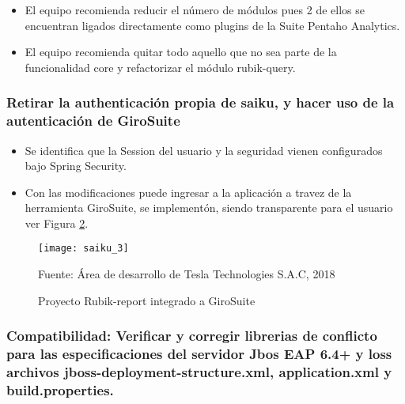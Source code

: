 \begin{spacing}{1.5}
\begin{itemize}
			\begin{figure}[H]
				\centering
				\texttt{[image: saiku\_2]}
				\caption {\centering \small{Proyecto Rubik-report, c\'{o}digo fuente}} \label{figure:chaperIII_5}
				\small {Fuente: \'{A}rea de desarrollo de Tesla Technologies S.A.C, 2018}
			\end{figure}
			
			\item El equipo recomienda reducir el n\'{u}mero de m\'{o}dulos pues 2 de ellos se encuentran ligados directamente como plugins de la Suite Pentaho Analytics.
			\item El equipo recomienda quitar todo aquello que no sea parte de la funcionalidad core y refactorizar el m\'{o}dulo rubik-query.
		\end{itemize}	
		\clearpage	
		\subsubsection{Retirar la authenticación propia de saiku, y hacer uso de la autenticación de GiroSuite}
		
		\begin{itemize}
			\item Se identifica que la Session  del usuario y la seguridad vienen configurados bajo Spring Security.
			\item Con las modificaciones puede ingresar a la aplicaci\'{o}n a travez de la herramienta GiroSuite, se implement\'{o}n, siendo transparente para el usuario ver Figura \ref{figure:chaperIII_6}.
		\end{itemize}
		
		\begin{figure}[H]
			\centering
			\texttt{[image: saiku\_3]}
			\caption {\centering \small{Proyecto Rubik-report integrado a GiroSuite}} \label{figure:chaperIII_6}
			\small {Fuente: \'{A}rea de desarrollo de Tesla Technologies S.A.C, 2018}
		\end{figure}	
			
		\subsubsection{Compatibilidad: Verificar y corregir librerias de conflicto para las especificaciones del servidor Jbos EAP 6.4+ y loss archivos jboss-deployment-structure.xml, application.xml y build.properties.}
		

\end{spacing}
